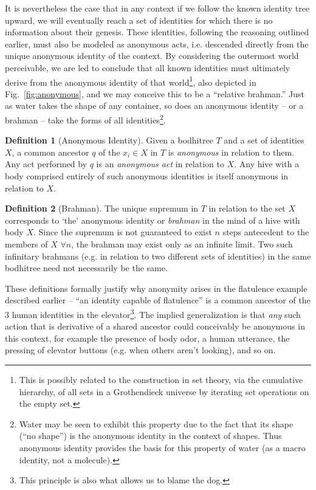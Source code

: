 \documentclass[pra,twocolumn,groupedaddress,10pt]{revtex4}
\theoremstyle{definition}
\newtheorem{defn}{Definition}[section]
\begin{document}
It is nevertheless the case that in any context if we follow the known identity tree upward, we will eventually reach a set of identities for which there is no information about their genesis. These identities, following the reasoning outlined earlier, must also be modeled as anonymous acts, i.e. descended directly from the unique anonymous identity of the context. By considering the outermost world perceivable, we are led to conclude that all known identities must ultimately derive from the anonymous identity of that world\footnote{This is possibly related to the construction in set theory, via the cumulative hierarchy, of all sets in a Grothendieck universe by iterating set operations on the empty set.}, also depicted in Fig.~\ref{fig:anonymous}, and we may conceive this to be a ``relative brahman.'' Just as water takes the shape of any container, so does an anonymous identity -- or a brahman -- take the forms of all identities\footnote{Water may be seen to exhibit this property due to the fact that its shape (``no shape'') is the anonymous identity in the context of shapes. Thus anonymous identity provides the basis for this property of water (as a macro identity, not a molecule).}.

\begin{defn}[Anonymous Identity]
	Given a bodhitree $T$ and a set of identities $X$, a common ancestor $q$ of the $x_i \in X$ in $T$ is \emph{anonymous} in relation to them. Any act performed by $q$ is an \emph{anonymous act} in relation to $X$. Any hive with a body comprised entirely of such anonymous identities is itself anonymous in relation to $X$.
\end{defn}

\begin{defn}[Brahman]
	The unique supremum in $T$ in relation to the set $X$ corresponds to `the' anonymous identity or \emph{brahman} in the mind of a hive with body $X$. Since the supremum is not guaranteed to exist $n$ steps antecedent to the members of $X$ $\forall n$, the brahman may exist only as an infinite limit. Two such infinitary brahmans (e.g. in relation to two different sets of identities) in the same bodhitree need not necessarily be the same.
\end{defn}

These definitions formally justify why anonymity arises in the flatulence example described earlier -- ``an identity capable of flatulence'' is a common ancestor of the $3$ human identities in the elevator\footnote{This principle is also what allows us to blame the dog.}. The implied generalization is that \textit{any} such action that is derivative of a shared ancestor could conceivably be anonymous in this context, for example the presence of body odor, a human utterance, the pressing of elevator buttons (e.g. when others aren't looking), and so on.
\end{document}
